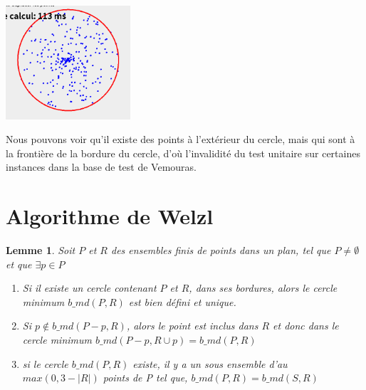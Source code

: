 \documentclass[12pt, a4paper, titlepage]{article}
\begin{document}
    \begin{center}
    \includegraphics[width=175px,
                     keepaspectratio,]{Screenshot from 2021-01-23 17-10-24.png}
    \end{center}
    
    Nous pouvons voir qu'il existe des points à l'extérieur du cercle, mais qui sont à la frontière de la bordure du cercle, d'où l'invalidité du test unitaire sur certaines instances dans la base de test de Vemouras.
\section{Algorithme de Welzl}
    \newtheorem{lemme}{Lemme}
    \begin{lemme}
        Soit $P$ et $R$ des ensembles finis de points dans un plan, tel que $P \neq \emptyset$ et que $\exists p \in P$
        \begin{enumerate}
            \item Si il existe un cercle contenant $P$ et $R$, dans ses bordures, alors le cercle minimum $b\_md(P, R)$ est bien défini et unique.
            \item Si $p \notin b\_md(P - {p}, R)$, alors le point est inclus dans $R$ et donc dans le cercle minimum $b\_md(P-{p}, R \cup {p}) = b\_md(P, R)$
            \item si le cercle $b\_md(P, R)$ existe, il y a un sous ensemble d'au $max(0, 3-|R|)$ points de P tel que, $b\_md(P, R) = b\_md(S, R)$
        \end{enumerate}
    \end{lemme}
\end{document}
